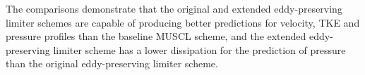 The comparisons demonstrate that the original and extended eddy-preserving limiter schemes are capable of producing better predictions for velocity, TKE and pressure profiles than the baseline MUSCL scheme, and the extended eddy-preserving limiter scheme has a lower dissipation for the prediction of pressure than the original eddy-preserving limiter scheme.
\begin{figure}[t]  
\centering
\centering
      \\             
      \\

\end{figure}
